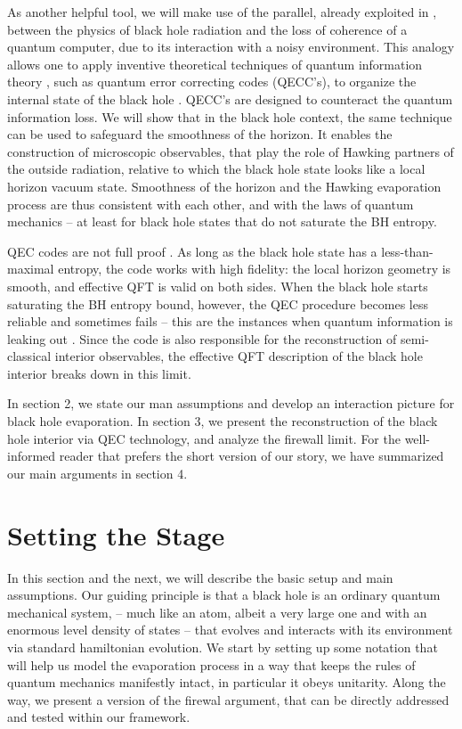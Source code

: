 \documentclass[12pt]{article}%
\begin{document}
 As another helpful tool,  we will make use of the parallel, already exploited in \cite{haydenpreskill}, between the physics of black hole radiation
and  the loss of coherence of a quantum computer, due to its interaction with a noisy environment. 
This analogy allows one to apply inventive
theoretical techniques of quantum information theory \cite{quantuminformation, preskilllectures}, such as quantum error correcting codes (QECC's), to organize
the internal state of the black hole \cite{haydenpreskill}.
QECC's are designed to counteract  the quantum information loss.  We will show that in the black hole context,  the same technique
can be used to safeguard the smoothness of the horizon. It enables the construction of microscopic observables, that play the role of Hawking partners
of the outside radiation, relative to which the black hole state looks like a local horizon vacuum state. 
Smoothness of the horizon and the Hawking evaporation process are thus consistent with each other, and with the laws of quantum mechanics --
 at least for black hole states that do not saturate the BH entropy.

QEC codes are not full proof \cite{preskilllectures}. 
As long as the black hole state has a less-than-maximal entropy, the code works with high fidelity:
the local horizon geometry is smooth, and effective QFT is valid on both sides. When the black hole starts saturating the BH entropy bound, however,
the QEC procedure becomes less reliable and sometimes fails  -- this are the instances when quantum information 
is leaking out \cite{haydenpreskill}. Since the code is also responsible for the reconstruction of 
semi-classical interior observables,  the effective QFT description of the black hole interior breaks down in this limit.
 
In section 2, we state our man assumptions and develop an interaction picture  for black hole evaporation.
In section 3, we present the reconstruction of the black hole interior via QEC technology, and analyze the firewall limit.
For the well-informed reader that prefers the short version of our story, we have summarized our main arguments in section 4.


\section{Setting the Stage}
\vspace{-2mm}

In this section and the next, we will describe the basic setup and main assumptions. Our guiding principle is that a black hole is an ordinary quantum mechanical system, 
-- much like an atom, albeit a very large one and with an enormous level density of states -- that evolves and interacts with its environment via standard hamiltonian evolution.  We start by setting up some notation that will 
help us model the evaporation process in a way that keeps the rules of quantum mechanics manifestly intact, in particular it obeys unitarity. Along the way, we present a version of the firewal argument, that can be directly addressed and tested within our framework.
\end{document}
